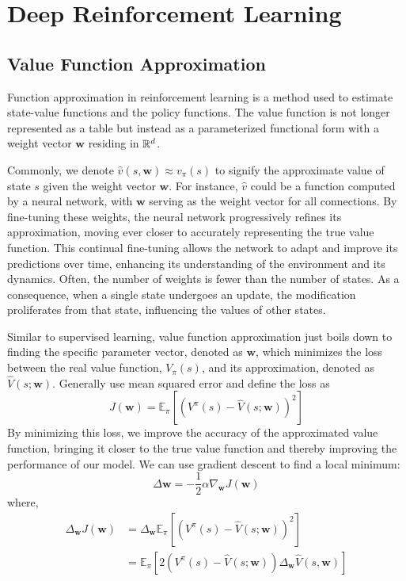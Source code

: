 \section{Deep Reinforcement Learning}


\subsection{Value Function Approximation}
Function approximation in reinforcement learning is a method used to estimate state-value functions and the policy functions.
The value function is not longer represented as a table but instead as a parameterized functional form with a weight vector $\mathbf{w}$ residing in $\mathbb R^d$.

Commonly, we denote $\hat{v}(s, \mathbf{w}) \approx v_{\pi}(s)$ to signify the approximate value of state $s$ given the weight vector $\mathbf{w}$. For instance, $\hat{v}$ could be a function computed by a neural network, with $\mathbf{w}$ serving as the weight vector for all connections. By fine-tuning these weights, the neural network progressively refines its approximation, moving ever closer to accurately representing the true value function. This continual fine-tuning allows the network to adapt and improve its predictions over time, enhancing its understanding of the environment and its dynamics.
Often, the number of weights is fewer than the number of states. As a consequence, when a single state undergoes an update, the modification proliferates from that state, influencing the values of other states.

Similar to supervised learning, value function approximation just boils down to finding the specific parameter vector, denoted as $\mathbf{w}$, which minimizes the loss between the real value function, $V_\pi(s)$, and its approximation, denoted as $\hat{V}(s; \boldsymbol{w})$. Generally use mean squared error and define the loss as
$$
J(\mathbf{w}) = \mathbb{E}_\pi[(V^\pi(s) - \hat{V}(s;  \mathbf{w}))^2]
$$
By minimizing this loss, we improve the accuracy of the approximated value function, bringing it closer to the true value function and thereby improving the performance of our model. We can  use gradient descent to find a local minimum:
$$
\Delta\mathbf{w} = -\frac{1}{2}\alpha \nabla_{\mathbf{w}} J(\mathbf{w})
$$
where,
\begin{align*}
\Delta_\mathbf{w} J(\mathbf{w}) &= \Delta_\mathbf{w} \mathbb{E}_\pi[(V^\pi(s) - \hat{V}(s;\mathbf{w}))^2] \\
&= \mathbb{E}_\pi[2(V^\pi(s) - \hat{V}(s;\mathbf{w})) \Delta_\mathbf{w} \hat{V}(s, \mathbf{w})]
\end{align*}


